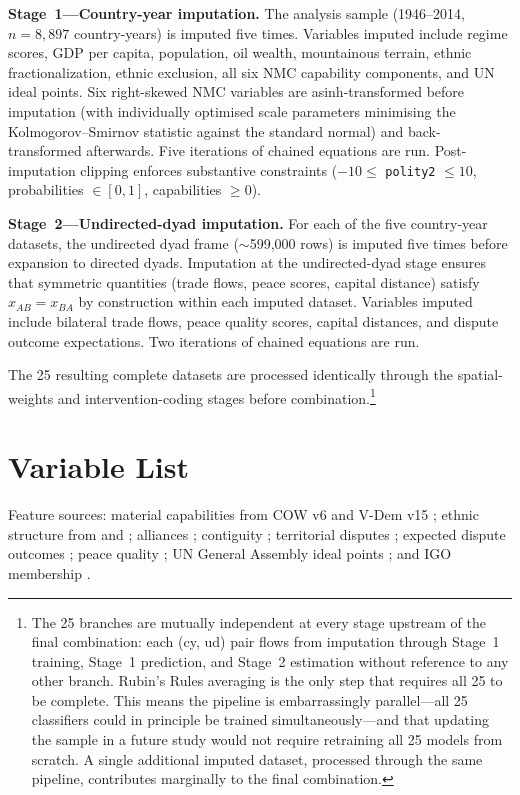 \textbf{Stage~1---Country-year imputation.}  The analysis sample (1946--2014, $n =
8{,}897$ country-years) is imputed five times.  Variables imputed include
regime scores, GDP per capita, population, oil wealth, mountainous terrain,
ethnic fractionalization, ethnic exclusion, all six NMC capability components,
and UN ideal points.  Six right-skewed NMC variables are asinh-transformed
before imputation (with individually optimised scale parameters minimising the
Kolmogorov--Smirnov statistic against the standard normal) and back-transformed
afterwards.  Five iterations of chained equations are run.  Post-imputation
clipping enforces substantive constraints ($-10 \leq$ \texttt{polity2} $\leq 10$,
probabilities $\in [0,1]$, capabilities $\geq 0$).

\textbf{Stage~2---Undirected-dyad imputation.}  For each of the five country-year
datasets, the undirected dyad frame (${\sim}$599,000 rows) is imputed five times before
expansion to directed dyads.  Imputation at the undirected-dyad stage ensures
that symmetric quantities (trade flows, peace scores, capital distance) satisfy
$x_{AB} = x_{BA}$ by construction within each imputed dataset.  Variables
imputed include bilateral trade flows, peace quality scores, capital distances,
and dispute outcome expectations.  Two iterations of chained equations are run.

The 25 resulting complete datasets are processed identically through the
spatial-weights and intervention-coding stages before combination.\footnote{%
  The 25 branches are mutually independent at every stage upstream of the
  final combination: each (cy, ud) pair flows from imputation through
  Stage~1 training, Stage~1 prediction, and Stage~2 estimation without
  reference to any other branch.  Rubin's Rules averaging is the only step
  that requires all 25 to be complete.  This means the pipeline is
  embarrassingly parallel---all 25 classifiers could in principle be trained
  simultaneously---and that updating the sample in a future study would not
  require retraining all 25 models from scratch.  A single additional
  imputed dataset, processed through the same pipeline, contributes
  marginally to the final combination.}

\section{Variable List}
\label{app:varlist}

Feature sources: material capabilities from COW v6 \citep{singer1987}
and V-Dem v15 \citep{vdem2025}; ethnic structure from
\citet{fearon2003} and \citet{cederman2010}; alliances
\citep{gibler2009}; contiguity \citep{stinnett2002}; territorial
disputes \citep{huth2003}; expected dispute outcomes
\citep{carroll2019}; peace quality \citep{diehl2019}; UN General
Assembly ideal points \citep{bailey2017}; and IGO membership
\citep{pevehouse2020}.

